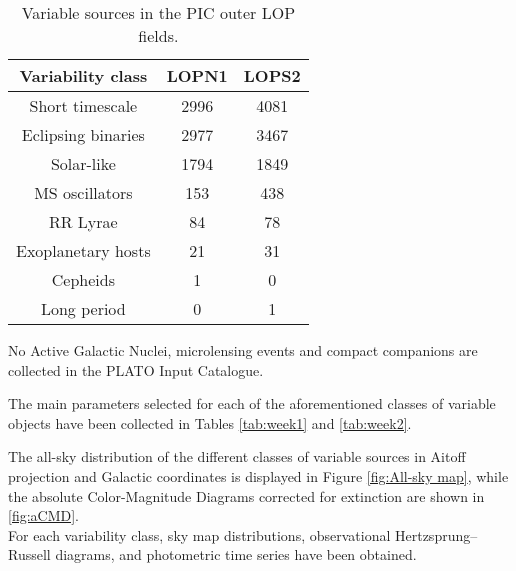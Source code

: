 \begin{table}
\centering
\begin{tabular}{c c c}
    \hline
    \hline
    Variability class & LOPN1 & LOPS2 \\
     \hline
    Short timescale & 2996 & 4081 \\
    Eclipsing binaries & 2977 & 3467 \\
    Solar-like & 1794 & 1849 \\
    MS oscillators & 153 & 438 \\
    RR Lyrae & 84 & 78 \\
    Exoplanetary hosts & 21 & 31 \\
    Cepheids & 1 & 0 \\
    Long period & 0 & 1 \\
    \hline
\end{tabular}
\caption{Variable sources in the PIC outer LOP fields.}
\label{tab:pic1_2}
\end{table}

No Active Galactic Nuclei, microlensing events and compact companions are collected in the PLATO Input Catalogue.


The main parameters selected for each of the aforementioned classes of variable objects have been collected in Tables \ref{tab:week1} and \ref{tab:week2}.

The all-sky distribution of the different classes of variable sources in Aitoff projection and Galactic coordinates is displayed in
Figure \ref{fig:All-sky map}, while the absolute Color-Magnitude Diagrams corrected for extinction are shown in \ref{fig:aCMD}.\\

For each variability class, sky map distributions, %
observational Hertzsprung–Russell diagrams, and photometric time series have been obtained.

